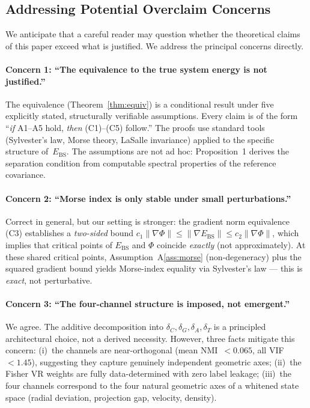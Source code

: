 \documentclass[11pt,a4paper]{article}
\newcommand{\Ebs}{E_{\mathrm{BS}}}
\newcommand{\grad}{\nabla}
\begin{document}
\subsection{Addressing Potential Overclaim Concerns}\label{sec:overclaim}

We anticipate that a careful reader may question whether the
theoretical claims of this paper exceed what is justified.  We
address the principal concerns directly.

\paragraph{Concern 1: ``The equivalence to the true system energy
is not justified.''}
The equivalence (Theorem~\ref{thm:equiv}) is a conditional result
under five explicitly stated, structurally verifiable assumptions.
Every claim is of the form ``\emph{if} A1--A5 hold, \emph{then}
(C1)--(C5) follow.''  The proofs use standard tools (Sylvester's
law, Morse theory, LaSalle invariance) applied to the specific
structure of~$\Ebs$.  The assumptions are not ad hoc: Proposition~1
derives the separation condition from computable spectral properties
of the reference covariance.

\paragraph{Concern 2: ``Morse index is only stable under small
perturbations.''}
Correct in general, but our setting is stronger: the gradient norm
equivalence (C3) establishes a \emph{two-sided} bound
$c_1\|\grad\Phi\| \le \|\grad\Ebs\| \le c_2\|\grad\Phi\|$, which
implies that critical points of $\Ebs$ and $\Phi$ coincide
\emph{exactly} (not approximately).  At these shared critical
points, Assumption~A\ref{ass:morse} (non-degeneracy) plus the
squared gradient bound yields Morse-index equality via Sylvester's
law --- this is \emph{exact}, not perturbative.

\paragraph{Concern 3: ``The four-channel structure is imposed,
not emergent.''}
We agree.  The additive decomposition into $\delta_C, \delta_G,
\delta_A, \delta_T$ is a principled architectural choice, not a
derived necessity.  However, three facts mitigate this concern:
(i)~the channels are near-orthogonal (mean NMI~$< 0.065$, all
VIF~$< 1.45$), suggesting they capture genuinely independent
geometric axes; (ii)~the Fisher VR weights are fully data-determined
with zero label leakage; (iii)~the four channels correspond to
the four natural geometric axes of a whitened state space
(radial deviation, projection gap, velocity, density).
\end{document}
